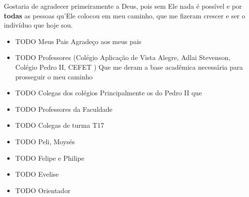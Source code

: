 Gostaria de agradecer primeiramente a Deus, pois sem Ele nada é
possível e por \textbf{todas} as pessoas qu'Ele colocou em meu
caminho, que me fizeram crescer e ser o indivíduo que hoje sou.

\begin{itemize}
\item TODO Meus Pais
Agradeço aos meus pais
\item TODO Professores (Colégio Aplicação de Vista Alegre, Adlai Stevenson, Colégio Pedro II, CEFET )
Que me deram a base acadêmica necessária para prosseguir o meu caminho
\item TODO Colegas dos colégios
Principalmente os do Pedro II que
\item TODO Professores da Faculdade

\item TODO Colegas de turma T17

\item TODO Peli, Moysés

\item TODO Felipe e Philipe

\item TODO Evelise

\item TODO Orientador
\end{itemize}
